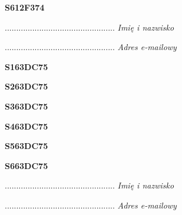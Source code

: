 \begin{turn}{90}\huge \textbf{S612F374}\end{turn}

\begin{turn}{90}\begin{minipage}{\linewidth} \vspace{20mm} ................................................  \textit{Imię i nazwisko}\end{minipage}\end{turn}

\begin{turn}{90}\begin{minipage}{\linewidth} \vspace{20mm} ................................................  \textit{Adres e-mailowy}\end{minipage}\end{turn}

\begin{turn}{90}\huge \textbf{S163DC75}\end{turn}

\begin{turn}{90}\huge \textbf{S263DC75}\end{turn}

\begin{turn}{90}\huge \textbf{S363DC75}\end{turn}

\begin{turn}{90}\huge \textbf{S463DC75}\end{turn}

\begin{turn}{90}\huge \textbf{S563DC75}\end{turn}

\begin{turn}{90}\huge \textbf{S663DC75}\end{turn}

\begin{turn}{90}\begin{minipage}{\linewidth} \vspace{20mm} ................................................  \textit{Imię i nazwisko}\end{minipage}\end{turn}

\begin{turn}{90}\begin{minipage}{\linewidth} \vspace{20mm} ................................................  \textit{Adres e-mailowy}\end{minipage}\end{turn}

